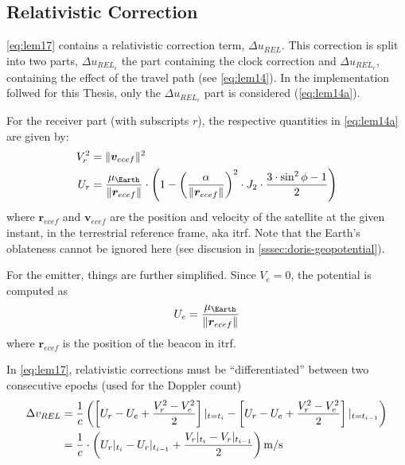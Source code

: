 \subsection{Relativistic Correction}\label{ssec:relativistic-correction}
\autoref{eq:lem17} contains a relativistic correction term, $\Delta u_{REL}$. This 
correction is split into two parts, $\Delta u_{REL_c}$ the part containing the 
clock correction and $\Delta u_{REL_r}$, containing the effect of the travel 
path (see \autoref{eq:lem14}). In the implementation follwed for this Thesis, only 
the $\Delta u_{REL_c}$ part is considered (\autoref{eq:lem14a}).

For the receiver part (with subscripts $r$), the respective quantities in 
\autoref{eq:lem14a} are given by:
\begin{equation}
  \begin{aligned}
    V^2_r &= \norm{\bm{v}_{ecef}}^2 \\
    U_r   &= \frac{\mu _{\Earth}}{\norm{\bm{r}_{ecef}}} \cdot \left( 1 - 
      \left(\frac{\alpha}{\norm{\bm{r}_{ecef}}}\right) ^2 \cdot J_2 \cdot
        \frac{3 \cdot \sin ^2{\phi} -1}{2} \right)
  \end{aligned}
  \label{eq:potential-receiver}
\end{equation}
where $\bm{r}_{ecef}$ and $\bm{v}_{ecef}$ are the position and velocity of the 
satellite at the given instant, in the terrestrial reference frame, 
aka \gls{itrf}. Note that the Earth's oblateness cannot be ignored here (see 
discusion in \autoref{sssec:doris-geopotential}).

For the emitter, things are further simplified. Since $V_e = 0$, the potential 
is computed as 
\begin{equation}
  U_e = \frac{\mu _{\Earth}}{\norm{\bm{r}_{ecef}}}
  \label{eq:potential-emitter}
\end{equation}
where $\bm{r}_{ecef}$ is the position of the beacon in \gls{itrf}.

In \autoref{eq:lem17}, relativistic corrections must be ``differentiated'' between 
two consecutive epochs (used for the Doppler count)
\begin{equation}\label{eq:drel-diff}
  \begin{aligned}
    \Delta v_{REL} &= \frac{1}{c} 
      \left( 
        \left[ U_r - U_e + \frac{V^2_r - V^2_e}{2} \right]\at{t=t_i} 
        - \left[ U_r - U_e + \frac{V^2_r - V^2_e}{2} \right]\at{t=t_{i-1}} 
      \right) \\
      &= \frac{1}{c} \cdot \left( 
        U_r\at{t_i} - U_r\at{t_{i-1}} +  \frac{V_r\at{t_i}-V_r\at{t_{i-1}}}{2} 
        \right) \si{\m\per\s}
  \end{aligned}
\end{equation}

